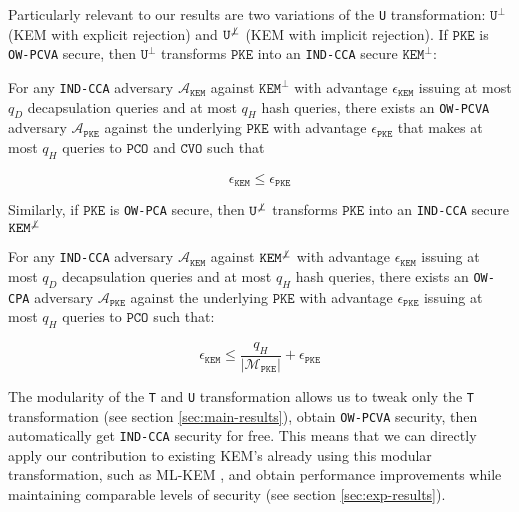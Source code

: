 \documentclass[floatrow,journal=tches,submission]{iacrtrans}
\newcommand{\monospace}{\texttt}
\newcommand{\pke}{\monospace{PKE}}
\newcommand{\kem}{\monospace{KEM}}
\newcommand{\pco}{\monospace{PCO}}
\newcommand{\cvo}{\monospace{CVO}}
\newcommand{\norm}[1]{\left\lvert #1 \right\rvert}
\begin{document}

Particularly relevant to our results are two variations of the \monospace{U} transformation: $\monospace{U}^\bot$ (KEM with explicit rejection) and $\monospace{U}^{\not\bot}$ (KEM with implicit rejection). If $\pke$ is \monospace{OW-PCVA} secure, then $\monospace{U}^\bot$ transforms $\pke$ into an \monospace{IND-CCA} secure $\kem^\bot$:

\begin{theorem}\label{thm:u-bot}
    For any \monospace{IND-CCA} adversary $\mathcal{A}_\kem$ against $\kem^\bot$ with advantage $\epsilon_\kem$ issuing at most $q_D$ decapsulation queries and at most $q_H$ hash queries, there exists an \monospace{OW-PCVA} adversary $\mathcal{A}_\pke$ against the underlying $\pke$ with advantage $\epsilon_\pke$ that makes at most $q_H$ queries to $\pco$ and $\cvo$ such that

    \begin{equation*}
        \epsilon_\kem \leq \epsilon_\pke
    \end{equation*}
\end{theorem}

Similarly, if $\pke$ is \monospace{OW-PCA} secure, then $\monospace{U}^{\not\bot}$ transforms $\pke$ into an \monospace{IND-CCA} secure $\kem^{\not\bot}$

\begin{theorem}\label{thm:u-notbot}
    For any \monospace{IND-CCA} adversary $\mathcal{A}_\kem$ against $\kem^{\not\bot}$ with advantage $\epsilon_\kem$ issuing at most $q_D$ decapsulation queries and at most $q_H$ hash queries, there exists an \monospace{OW-CPA} adversary $\mathcal{A}_\pke$ against the underlying $\pke$ with advantage $\epsilon_\pke$ issuing at most $q_H$ queries to $\pco$ such that:

    \begin{equation*}
        \epsilon_\kem \leq \frac{q_H}{\norm{\mathcal{M}_\pke}} + \epsilon_\pke
    \end{equation*}
\end{theorem}

The modularity of the \monospace{T} and \monospace{U} transformation allows us to tweak only the \monospace{T} transformation (see section \ref{sec:main-results}), obtain \monospace{OW-PCVA} security, then automatically get \monospace{IND-CCA} security for free. This means that we can directly apply our contribution to existing KEM's already using this modular transformation, such as ML-KEM \cite{key2023mechanism}, and obtain performance improvements while maintaining comparable levels of security (see section \ref{sec:exp-results}).
\end{document}
